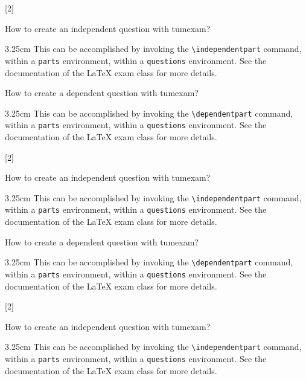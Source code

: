 \documentclass[english, @CLASSOPTIONS@]{tumexam}
\begin{document}
\begin{questions}
  \clearpage
  [2]
  \begin{parts}
    \independentpart
    How to create an independent question with tumexam?
    \begin{solutionbox}{3.25cm}
      This can be accomplished by invoking the \texttt{\textbackslash{independentpart}} command, within a \texttt{parts} environment, within a \texttt{questions} environment. See the documentation of the \LaTeX{} exam class for more details.
    \end{solutionbox}
    \dependentpart
    How to create a dependent question with tumexam?
    \begin{solutionbox}{3.25cm}
      This can be accomplished by invoking the \texttt{\textbackslash{dependentpart}} command, within a \texttt{parts} environment, within a \texttt{questions} environment. See the documentation of the \LaTeX{} exam class for more details.
    \end{solutionbox}
  \end{parts}
  \clearpage
  [2]
  \begin{parts}
    \independentpart
    How to create an independent question with tumexam?
    \begin{solutionbox}{3.25cm}
      This can be accomplished by invoking the \texttt{\textbackslash{independentpart}} command, within a \texttt{parts} environment, within a \texttt{questions} environment. See the documentation of the \LaTeX{} exam class for more details.
    \end{solutionbox}
    \dependentpart
    How to create a dependent question with tumexam?
    \begin{solutionbox}{3.25cm}
      This can be accomplished by invoking the \texttt{\textbackslash{dependentpart}} command, within a \texttt{parts} environment, within a \texttt{questions} environment. See the documentation of the \LaTeX{} exam class for more details.
    \end{solutionbox}
  \end{parts}
  \clearpage
  [2]
  \begin{parts}
    \independentpart
    How to create an independent question with tumexam?
    \begin{solutionbox}{3.25cm}
      This can be accomplished by invoking the \texttt{\textbackslash{independentpart}} command, within a \texttt{parts} environment, within a \texttt{questions} environment. See the documentation of the \LaTeX{} exam class for more details.

\end{solutionbox}
\end{parts}
\end{questions}
\end{document}
